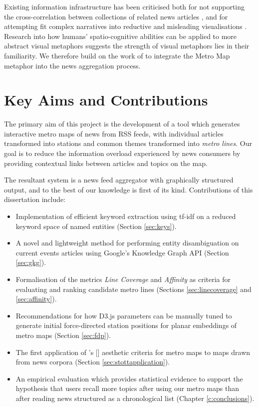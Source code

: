 Existing information infrastructure has been criticised both for not supporting the cross-correlation between collections of related news articles \citep{GalaxyOfNews}, and for attempting fit complex narratives into reductive and misleading visualisations \citep{InformationCartography}. Research into how humans' spatio-cognitive abilities can be applied to more abstract visual metaphors \citep{FromMetaphorToMethod} suggests the strength of visual metaphors lies in their familiarity. We therefore build on the work of \cite{GeneratingInformationMaps} to integrate the Metro Map metaphor into the news aggregation process.

\section*{Key Aims and Contributions}
The primary aim of this project is the development of a tool which generates interactive metro maps of news from RSS feeds, with individual articles transformed into stations and common themes transformed into \textit{metro lines}. Our goal is to reduce the information overload experienced by news consumers by providing contextual links between articles and topics on the map.

The resultant system is a news feed aggregator with graphically structured output, and to the best of our knowledge is first of its kind. Contributions of this dissertation include:\vspace{-0.3cm}
\begin{itemize}[itemsep=0.1em]
	\item Implementation of efficient keyword extraction using tf-idf \citep{tfidf} on a reduced keyword space of named entities (Section \ref{sec:keys}).
	\item A novel and lightweight method for performing entity disambiguation on current events articles using Google's Knowledge Graph API (Section \ref{sec:gkg}).
	\item Formalisation of the metrics \textit{Line Coverage} and \textit{Affinity} as criteria for evaluating and ranking candidate metro lines (Sections \ref{sec:linecoverage} and \ref{sec:affinity}).
	\item Recommendations for how D3.js parameters can be manually tuned to generate initial force-directed station positions for planar embeddings of metro maps (Section \ref{sec:fdp}).
	\item The first application of \citeauthor{AutomaticMetroMapLayoutThesis}'s [\citeyear{AutomaticMetroMapLayoutThesis, AutomaticMetroMapLayout}] aesthetic criteria for metro maps to maps drawn from news corpora (Section \ref{sec:stottapplication}).
	\item An empirical evaluation which provides statistical evidence to support the hypothesis that users recall more topics after using our metro maps than after reading news structured as a chronological list (Chapter \ref{c:conclusions}). 
\end{itemize}
 

